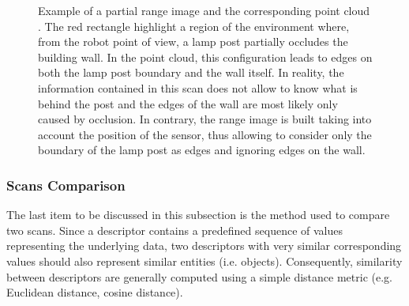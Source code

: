 \begin{figure}[H]
    \centering
    \caption{Example of a partial range image \protect{} and the corresponding point cloud \protect{}. The red rectangle highlight a region of the environment where, from the robot point of view, a lamp post partially occludes the building wall. In the point cloud, this configuration leads to edges on both the lamp post boundary and the wall itself. In reality, the information contained in this scan does not allow to know what is behind the post and the edges of the wall are most likely only caused by occlusion. In contrary, the range image is built taking into account the position of the sensor, thus allowing to consider only the boundary of the lamp post as edges and ignoring edges on the wall.}
    \label{fig:chap_slam_edges}
\end{figure}

\subsubsection{Scans Comparison}
\label{ssub:scans_comparison}

The last item to be discussed in this subsection is the method used to compare two scans. Since a descriptor contains a predefined sequence of values representing the underlying data, two descriptors with very similar corresponding values should also represent similar entities (i.e. objects). Consequently, similarity between descriptors are generally computed using a simple distance metric (e.g. Euclidean distance, cosine distance).


